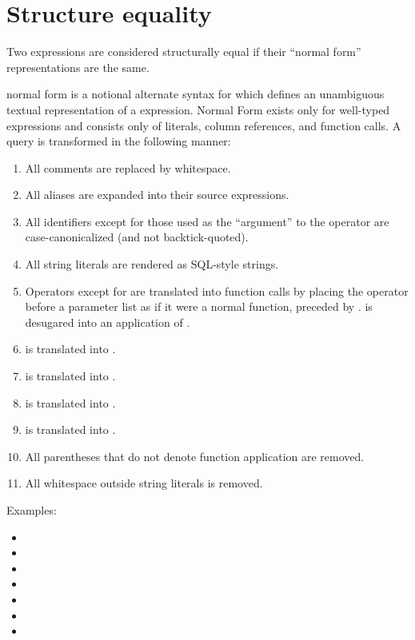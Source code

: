 \documentclass{article}
\begin{document}
\section{Structure equality}\label{structuralequality}

Two expressions are considered structurally equal if their ``normal
form'' representations are the same.

\SoQL{} normal form is a notional alternate syntax for \SoQL{} which
defines an unambiguous textual representation of a \SoQL{} expression.
Normal Form \SoQL{} exists only for well-typed expressions and
consists only of literals, column references, and function calls.  A
\SoQL{} query is transformed in the following manner:
\begin{enumerate}
\item All comments are replaced by whitespace.
\item All aliases are expanded into their source expressions.
\item All identifiers except for those used as the ``argument'' to the
   operator are case-canonicalized (and not backtick-quoted).
\item All string literals are rendered as SQL-style strings.
\item Operators except for  are translated into function calls
  by placing the operator before a parameter list as if it were a
  normal function, preceded by .   is desugared into
  an application of .
\item {} is translated into
  .
\item {} is translated into
  .
\item {} is translated
  into .
\item {} is translated
  into .
\item All parentheses that do not denote function application are removed.
\item All whitespace outside string literals is removed.
\end{enumerate}

Examples:
\begin{itemize}
\item {}\transformsTo{}
\item {}\transformsTo{}
\item {}\transformsTo{}
\item {}\transformsTo{}
\item {}\transformsTo{}
\item {}\transformsTo{}
\item {}\transformsTo{}
\end{itemize}
\end{document}

